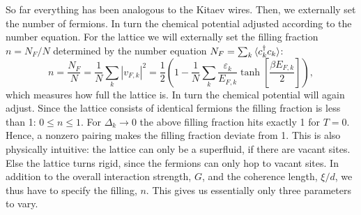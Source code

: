 So far everything has been analogous to the Kitaev wires. Then, we externally set the number of fermions. In turn the chemical potential adjusted according to the number equation. For the lattice we will externally set the filling fraction $n = N_F / N$ determined by the number equation $N_F = \sum_k \braket{c^\dagger_k c_k}$:
\begin{equation}
n = \frac{N_F}{N} = \frac{1}{N}\sum_k |v_{F,k}|^2 = \frac{1}{2}\left(1 - \frac{1}{N}\sum_k \frac{\varepsilon_k}{E_{F,k}}\tanh\left[\frac{\beta E_{F,k}}{2} \right] \right), 
\label{eq.fillingfraction.lattice}
\end{equation}
which measures how full the lattice is. In turn the chemical potential will again adjust. Since the lattice consists of identical fermions the filling fraction is less than 1: $0 \leq n \leq 1$. For $\Delta_k \to 0$ the above filling fraction hits exactly 1 for $T = 0$. Hence, a nonzero pairing makes the filling fraction deviate from 1. This is also physically intuitive: the lattice can only be a superfluid, if there are vacant sites. Else the lattice turns rigid, since the fermions can only hop to vacant sites. In addition to the overall interaction strength, $G$, and the coherence length, $\xi / d$, we thus have to specify the filling, $n$. This gives us essentially only three parameters to vary. 

